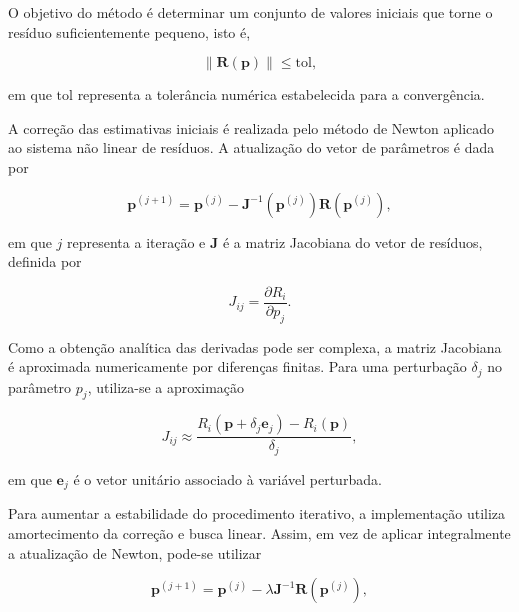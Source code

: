 \documentclass[arial,centeredequations,english,brazilian,oneside,section=TITLE]{ifes8}
\begin{document}
O objetivo do método é determinar um conjunto de valores iniciais
que torne o resíduo suficientemente pequeno, isto é,

\begin{equation}
  \left\|\mathbf{R}(\mathbf{p})\right\| \leq \mathrm{tol},
  \label{eq:criterio-tiro}
\end{equation}

em que $\mathrm{tol}$ representa a tolerância numérica estabelecida
para a convergência.

A correção das estimativas iniciais é realizada pelo método de
Newton aplicado ao sistema não linear de resíduos. A atualização
do vetor de parâmetros é dada por

\begin{equation}
  \mathbf{p}^{(j+1)}
  =
  \mathbf{p}^{(j)}
  -
  \mathbf{J}^{-1}
  \left(\mathbf{p}^{(j)}\right)
  \mathbf{R}\left(\mathbf{p}^{(j)}\right),
  \label{eq:newton-sistema}
\end{equation}

em que $j$ representa a iteração e $\mathbf{J}$ é a matriz
Jacobiana do vetor de resíduos, definida por

\begin{equation}
  J_{ij} =
  \frac{\partial R_i}{\partial p_j}.
  \label{eq:jacobiana}
\end{equation}

Como a obtenção analítica das derivadas pode ser complexa, a matriz
Jacobiana é aproximada numericamente por diferenças finitas. Para
uma perturbação $\delta_j$ no parâmetro $p_j$, utiliza-se a
aproximação

\begin{equation}
  J_{ij}
  \approx
  \frac{
    R_i(\mathbf{p}+\delta_j\mathbf{e}_j)
    -
    R_i(\mathbf{p})
  }{\delta_j},
  \label{eq:jacobiana-diferencas}
\end{equation}

em que $\mathbf{e}_j$ é o vetor unitário associado à variável
perturbada.

Para aumentar a estabilidade do procedimento iterativo, a
implementação utiliza amortecimento da correção e busca linear.
Assim, em vez de aplicar integralmente a atualização de Newton,
pode-se utilizar

\begin{equation}
  \mathbf{p}^{(j+1)}
  =
  \mathbf{p}^{(j)}
  -
  \lambda
  \mathbf{J}^{-1}
  \mathbf{R}\left(\mathbf{p}^{(j)}\right),
  \label{eq:newton-amortecido}
\end{equation}
\end{document}
